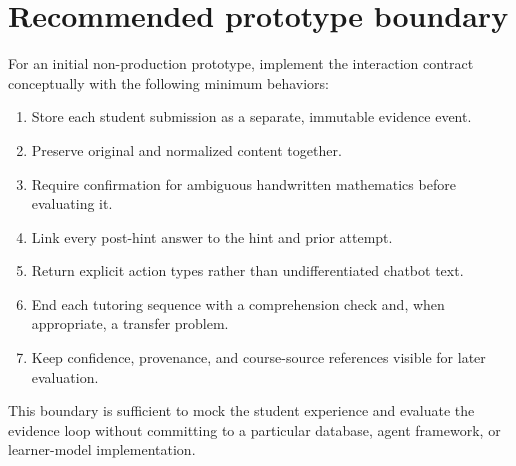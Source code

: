 \documentclass[11pt]{article}
\begin{document}
\section{Recommended prototype boundary}

For an initial non-production prototype, implement the interaction contract conceptually with the following minimum behaviors:

\begin{enumerate}
    \item Store each student submission as a separate, immutable evidence event.
    \item Preserve original and normalized content together.
    \item Require confirmation for ambiguous handwritten mathematics before evaluating it.
    \item Link every post-hint answer to the hint and prior attempt.
    \item Return explicit action types rather than undifferentiated chatbot text.
    \item End each tutoring sequence with a comprehension check and, when appropriate, a transfer problem.
    \item Keep confidence, provenance, and course-source references visible for later evaluation.
\end{enumerate}

This boundary is sufficient to mock the student experience and evaluate the evidence loop without committing to a particular database, agent framework, or learner-model implementation.
\end{document}
